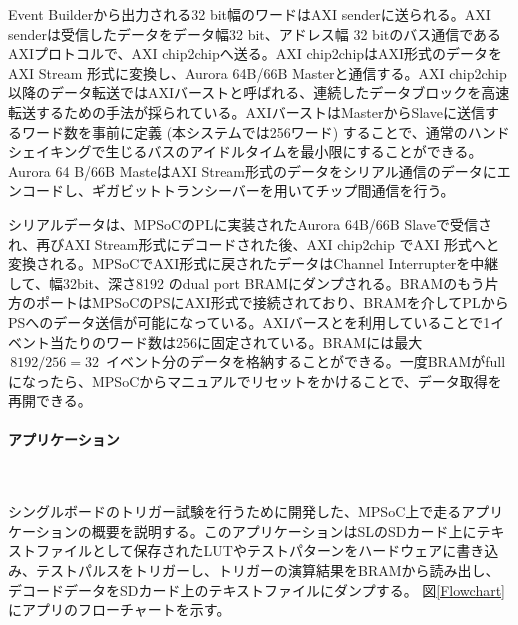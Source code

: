 Event Builderから出力される32 bit幅のワードはAXI senderに送られる。AXI senderは受信したデータをデータ幅32 bit、アドレス幅 32 bitのバス通信であるAXIプロトコルで、AXI chip2chipへ送る。AXI chip2chipはAXI形式のデータをAXI Stream 形式に変換し、Aurora 64B/66B Masterと通信する。AXI chip2chip以降のデータ転送ではAXIバーストと呼ばれる、連続したデータブロックを高速転送するための手法が採られている。AXIバーストはMasterからSlaveに送信するワード数を事前に定義 (本システムでは256ワード) することで、通常のハンドシェイキングで生じるバスのアイドルタイムを最小限にすることができる。
Aurora 64 B/66B MasteはAXI Stream形式のデータをシリアル通信のデータにエンコードし、ギガビットトランシーバーを用いてチップ間通信を行う。

シリアルデータは、MPSoCのPLに実装されたAurora 64B/66B Slaveで受信され、再びAXI Stream形式にデコードされた後、AXI chip2chip でAXI 形式へと変換される。MPSoCでAXI形式に戻されたデータはChannel Interrupterを中継して、幅32bit、深さ8192 のdual port BRAMにダンプされる。BRAMのもう片方のポートはMPSoCのPSにAXI形式で接続されており、BRAMを介してPLからPSへのデータ送信が可能になっている。AXIバースとを利用していることで1イベント当たりのワード数は256に固定されている。BRAMには最大$ \,8192 / 256 = 32\,$ イベント分のデータを格納することができる。一度BRAMがfullになったら、MPSoCからマニュアルでリセットをかけることで、データ取得を再開できる。

\paragraph{アプリケーション}　　
\par
シングルボードのトリガー試験を行うために開発した、MPSoC上で走るアプリケーションの概要を説明する。このアプリケーションはSLのSDカード上にテキストファイルとして保存されたLUTやテストパターンをハードウェアに書き込み、テストパルスをトリガーし、トリガーの演算結果をBRAMから読み出し、デコードデータをSDカード上のテキストファイルにダンプする。
図\ref{Flowchart}にアプリのフローチャートを示す。

